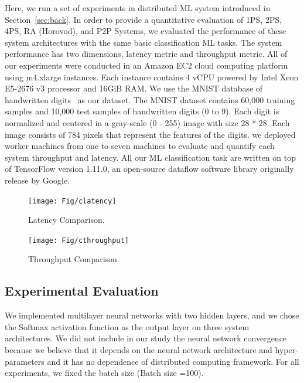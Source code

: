 \documentclass[conference]{IEEEtran}
\begin{document}
Here, we run a set of experiments in distributed ML system introduced in Section~\ref{sec:back}. In order to provide a quantitative evaluation of 1PS, 2PS, 4PS, RA (Horovod), and P2P Systems, we evaluated the performance of these system architectures with the same basic classification ML tasks. The system performance has two dimensions, latency metric and throughput metric.  All of our experiments were conducted in an Amazon EC2 cloud computing platform using m4.xlarge instances. Each instance contains 4 vCPU powered by Intel Xeon E5-2676 v3 processor and 16GiB RAM. We use the MNIST database of handwritten digits~\cite{MNIST} as our dataset. The MNIST dataset contains 60,000 training samples and 10,000 test samples of handwritten digits (0 to 9). Each digit is normalized and centered in a gray-scale (0 - 255) image with size 28 * 28. Each image consists of 784 pixels that represent the features of the digits. we deployed worker machines from one to seven machines to evaluate and quantify each system throughput and latency. All our ML classification task are written on top of TensorFlow version 1.11.0, an open-source dataflow software library originally release by Google.


\begin{figure}[htb]
  \texttt{[image: Fig/clatency]}
  \caption{Latency Comparison.}
  \label{fig:clatency}
\end{figure}

\begin{figure}[htb]
  \texttt{[image: Fig/cthroughput]}
  \caption{Throughput Comparison.}
  \label{fig:cthroughput}
\end{figure}


\subsection{Experimental Evaluation}

We implemented multilayer neural networks with two hidden layers, and we chose the Softmax activation function as the output layer on three system architectures. We did not include in our study the neural network convergence because we believe that it depends on the neural network architecture and hyper-parameters and it has no dependence of distributed computing framework. For all experiments, we fixed the batch size (Batch size =100). 

\iffalse 
\end{document}
